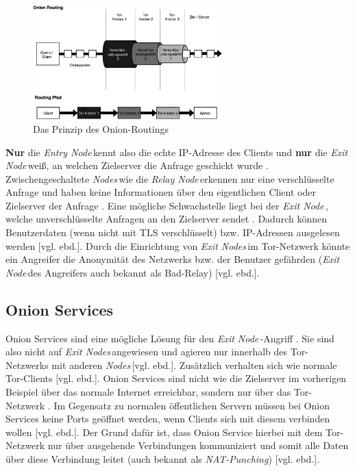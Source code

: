 \documentclass[a4paper,ngerman, headheight=28pt,12pt, footheight=27pt]{scrartcl}
\newcommand{\vcite}[1]{\cite[vgl.][]{#1}}
\newcommand{\vebd}{[vgl. ebd.]}
\newcommand{\entryn}{\textit{Entry Node\,}}
\newcommand{\relayn}{\textit{Relay Node\,}}
\newcommand{\exitn}{\textit{Exit Node\,}}
\newcommand{\exitns}{\textit{Exit Nodes\,}}
\newcommand{\nodes}{\textit{Nodes\,}}
\begin{document}
\begin{figure}[H]
  \centering
  \includegraphics[width=0.65\textwidth]{TorRoutingSimple.png}
  \caption{Das Prinzip des Onion-Routings \vcite{fig:Tor-Structure} \label{fig:TorStructure}}
\end{figure}
\textbf{Nur} die \entryn kennt also die echte IP-Adresse des Clients und \textbf{nur} die \exitn weiß, an welchen Zielserver die Anfrage geschickt wurde \vcite{TorStructure}. Zwischengeschaltete \nodes wie die \relayn erkennen nur eine verschlüsselte Anfrage und haben keine Informationen über den eigentlichen Client oder Zielserver der Anfrage \vcite{EEFTor}.
Eine mögliche Schwachstelle liegt bei der \exitn, welche unverschlüsselte Anfragen an den Zielserver sendet \vcite{TorBadRelay}. Dadurch können Benutzerdaten (wenn nicht mit TLS verschlüsselt) bzw. IP-Adressen ausgelesen werden \vebd. Durch die Einrichtung von \exitns im Tor-Netzwerk könnte ein Angreifer die Anonymität des Netzwerks bzw. der Benutzer gefährden (\exitn des Angreifers auch bekannt als Bad-Relay) \vebd.

\subsection{Onion Services}
Onion Services sind eine mögliche Lösung für den \exitn-Angriff \vcite{TorOnionServiceTalk}. Sie sind also nicht auf \exitns angewiesen und agieren nur innerhalb des Tor-Netzwerks mit anderen \nodes \vebd. Zusätzlich verhalten sich wie normale Tor-Clients \vebd.
Onion Services sind nicht wie die Zielserver im vorherigen Beispiel über das normale Internet erreichbar, sondern nur über das Tor-Netzwerk \vcite{TorOnionService}. Im Gegensatz zu normalen öffentlichen Servern müssen bei Onion Services keine Ports geöffnet werden, wenn Clients sich mit diesem verbinden wollen \vebd. Der Grund dafür ist, dass Onion Service hierbei mit dem Tor-Netzwerk nur über ausgehende Verbindungen kommuniziert und somit alle Daten über diese Verbindung leitet (auch bekannt als \textit{NAT-Punching}) \vebd.
\end{document}
